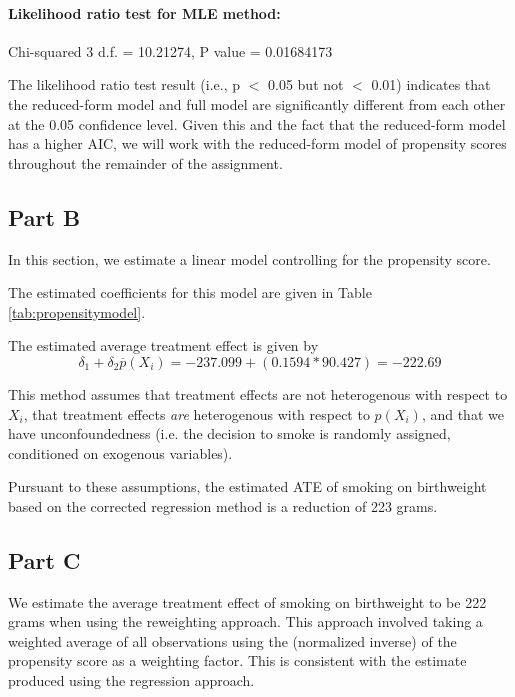 \documentclass[letterpaper, 12pt]{article}
\begin{document}
\paragraph{Likelihood ratio test for MLE method:} Chi-squared 3 d.f. =  10.21274, P value =  0.01684173 

The likelihood ratio test result (i.e., p $<$ 0.05 but not $<$ 0.01) indicates that the reduced-form model and full model are significantly different from each other at the 0.05 confidence level. Given this and the fact that the reduced-form model has a higher AIC, we will work with the reduced-form model of propensity scores throughout the remainder of the assignment.

\subsection{Part B}

In this section, we estimate a linear model controlling for the propensity score. 


The estimated coefficients for this model are given in Table \ref{tab:propensitymodel}. 



The estimated average treatment effect is given by 
\begin{equation}
\delta_1 + \delta_2 \overline{p}(X_i)=-237.099 + (0.1594 * 90.427)=-222.69
\end{equation}

This method assumes that treatment effects are not heterogenous with respect to $X_i$, that treatment effects \emph{are} heterogenous with respect to $p(X_i)$, and that we have unconfoundedness (i.e. the decision to smoke is randomly assigned, conditioned on exogenous variables).

Pursuant to these assumptions, the estimated ATE of smoking on birthweight based on the corrected regression method is a reduction of 223 grams.

\subsection{Part C}
We estimate the average treatment effect of smoking on birthweight to be 222 grams when using the reweighting approach. This approach involved taking a weighted average of all observations using the (normalized inverse) of the propensity score as a weighting factor. This is consistent with the estimate produced using the regression approach.
\end{document}

